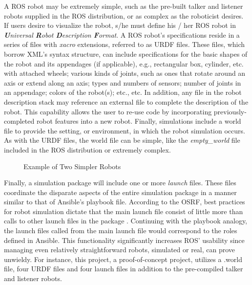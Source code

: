 \documentclass[9pt,twocolumn,twoside]{../../styles/osajnl}
\begin{document}
A ROS robot may be extremely simple, such as the pre-built talker and listener robots supplied in the ROS distribution, or as complex as the roboticist desires.  If users desire to visualize the robot, s/he must define his / her ROS robot in \textit{\textbf{U}niversal \textbf{R}obot \textbf{D}escription \textbf{F}ormat}.  A ROS robot's specifications reside in a series of files with \textit{xacro} extensions, referred to as URDF files.  These files, which borrow XML's syntax structure, can include specifications for the basic shapes of the robot and its appendages (if applicable), e.g., rectangular box, cylinder, etc. with attached wheels; various kinds of joints, such as ones that rotate around an axis or extend along an axis; types and numbers of sensors; number of joints in an appendage; colors of the robot(s); etc., etc.  In addition, any file in the robot description stack may reference an external file to complete the description of the robot.  This capability allows the user to re-use code by incorporating previously-completed robot features into a new robot.  Finally, simulations include a world file to provide the setting, or environment, in which the robot simulation occurs.  As with the URDF files, the world file can be simple, like the \textit{empty\_world} file included in the ROS distribution or extremely complex.  

\begin{figure}[htbp]
\centering
{}
\caption{Example of Two Simpler Robots}
\label{fig:simplerRobots}
\end{figure}

Finally, a simulation package will include one or more \textit{launch} files.  These files coordinate the disparate aspects of the entire simulation package in a manner similar to that of Ansible's playbook file.  According to the OSRF, best practices for robot simulation dictate that the main launch file consist of little more than calls to other launch files in the package \cite{www-ros-launch}.  Continuing with the playbook analogy, the launch files called from the main launch file would correspond to the roles defined in Ansible.  This functionality significantly increases ROS' usability since managing even relatively straightforward robots, simulated or real, can prove unwieldy. For instance, this project, a proof-of-concept project, utilizes a .world file, four URDF files and four launch files in addition to the pre-compiled talker and listener robots.  
\end{document}

